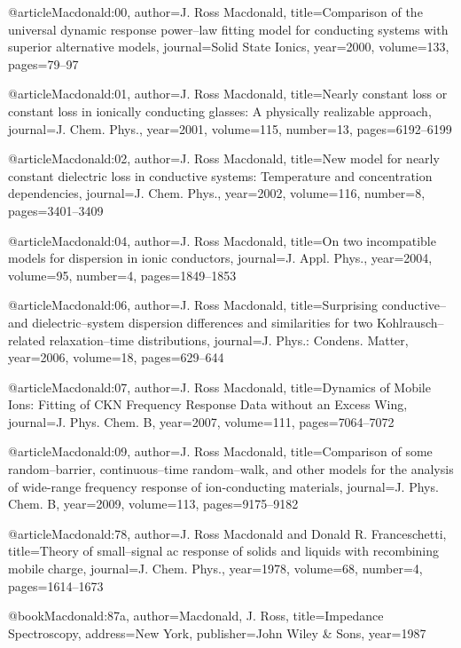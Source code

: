 \begin{thebibliography}{99}
@article{Macdonald:00,
  author={J. Ross Macdonald},
  title={Comparison of the universal dynamic response power--law fitting model
    for conducting systems with superior alternative models},
  journal={Solid State Ionics},
  year={2000},
  volume={133},
  pages={79--97}
}

@article{Macdonald:01,
  author={J. Ross Macdonald},
  title={Nearly constant loss or constant loss in ionically conducting glasses:
    A physically realizable approach},
  journal={J. Chem. Phys.},
  year={2001},
  volume={115},
  number={13},
  pages={6192--6199}
}

@article{Macdonald:02,
  author={J. Ross Macdonald},
  title={New model for nearly constant dielectric loss in conductive systems: Temperature
    and concentration dependencies},
  journal={J. Chem. Phys.},
  year={2002},
  volume={116},
  number={8},
  pages={3401--3409}
}

@article{Macdonald:04,
  author={J. Ross Macdonald},
  title={On two incompatible models for dispersion in ionic conductors},
  journal={J. Appl. Phys.},
  year={2004},
  volume={95},
  number={4},
  pages={1849--1853}
}

@article{Macdonald:06,
  author={J. Ross Macdonald},
  title={Surprising conductive-- and dielectric--system dispersion differences
    and similarities for two {K}ohlrausch--related relaxation--time distributions},
  journal={J. Phys.: Condens. Matter},
  year={2006},
  volume={18},
  pages={629--644}
}

@article{Macdonald:07,
  author={J. Ross Macdonald},
  title={Dynamics of Mobile Ions: Fitting of {CKN} Frequency Response Data without
    an Excess Wing},
  journal={J. Phys. Chem. B},
  year={2007},
  volume={111},
  pages={7064--7072}
}

@article{Macdonald:09,
  author={J. Ross Macdonald},
  title={Comparison of some random--barrier, continuous--time random--walk, and
    other models for the analysis of wide-range frequency response of ion-conducting
    materials},
  journal={J. Phys. Chem. B},
  year={2009},
  volume={113},
  pages={9175--9182}
}

@article{Macdonald:78,
  author={J. Ross Macdonald and Donald R. Franceschetti},
  title={Theory of small--signal ac response of solids and liquids with recombining
    mobile charge},
  journal={J. Chem. Phys.},
  year={1978},
  volume={68},
  number={4},
  pages={1614--1673}
}

@book{Macdonald:87a,
  author={Macdonald, J. Ross},
  title={Impedance Spectroscopy},
  address={New York},
  publisher={John Wiley {\&} Sons},
  year={1987}
}


\end{thebibliography}
